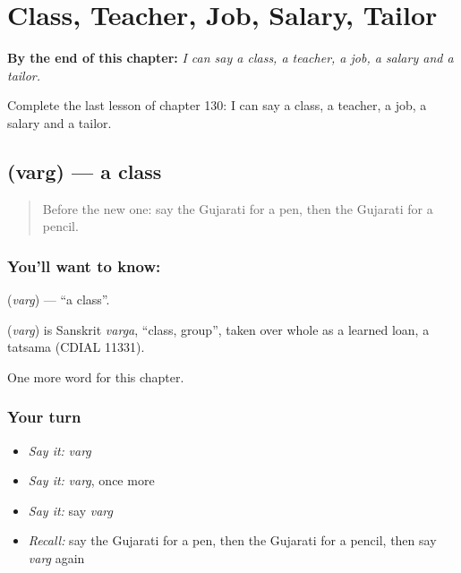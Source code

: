 
\chapter{Class, Teacher, Job, Salary, Tailor}
\label{ch:gu-class-teacher-job-salary-tailor}

\begin{chapteropening}
\textbf{By the end of this chapter:} \emph{I can say a class, a teacher, a job, a salary and a tailor.}

Complete the last lesson of chapter 130: I can say a class, a teacher, a job, a salary and a tailor.
\end{chapteropening}

\section[\texorpdfstring{\gu{વર્ગ} (varg)}{વર્ગ (varg)}]{ (varg) — a class}

\label{lesson:GU-C130-varg}



\begin{quote}
Before the new one: say the Gujarati for a pen, then the Gujarati for a pencil.
\end{quote}

\subsection*{You'll want to know: }
\textbf{} (\emph{varg}) — \textquotedblleft{}a class\textquotedblright{}.

\begin{cousinweb}
\textbf{} (\emph{varg}) is Sanskrit \emph{varga}, \textquotedblleft{}class, group\textquotedblright{}, taken over whole as a learned loan, a tatsama (CDIAL 11331).
\end{cousinweb}

\begin{grammarlens}[title={What you've built}]
One more word for this chapter.
\end{grammarlens}

\subsection*{Your turn}
\begin{itemize}
\raggedright
  \item \emph{Say it:} \emph{varg}
  \item \emph{Say it:} \emph{varg}, once more
  \item \emph{Say it:} say \emph{varg}
  \item \emph{Recall:} say the Gujarati for a pen, then the Gujarati for a pencil, then say \emph{varg} again
\end{itemize}

